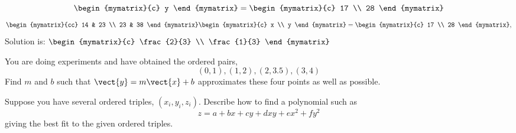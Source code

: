 \begin{enumialphparenastyle}
\begin{ex}
\begin{sol}
\[\begin{mymatrix}{c}
y
\end{mymatrix} =\begin{mymatrix}{c}
17 \\
28
\end{mymatrix}
\]
\[
\begin{mymatrix}{cc}
14 & 23 \\
23 & 38
\end{mymatrix} \begin{mymatrix}{c}
x \\
y
\end{mymatrix} =\begin{mymatrix}{c}
17 \\
28
\end{mymatrix} ,
\]
Solution is: $\begin{mymatrix}{c}
\frac{2}{3} \\
\frac{1}{3}
\end{mymatrix}$
\end{sol}
\end{ex}

\begin{ex}
 You are doing experiments and have obtained the ordered pairs, 
\begin{equation*}
\left( 0,1\right) ,\left( 1,2\right) ,\left( 2,3.5\right) ,\left( 3,4\right)
\end{equation*}
Find $m$ and $b$ such that $\vect{y}=m\vect{x}+b$ approximates these four points as well
as possible. 
\end{ex}

\begin{ex}
Suppose you have several ordered triples, $\left(
x_{i},y_{i},z_{i}\right) .$ Describe how to find a polynomial such as  
\begin{equation*}
z=a+bx+cy+dxy+ex^{2}+fy^{2}
\end{equation*}
 giving the best fit to the given ordered triples.
\end{ex}

\end{enumialphparenastyle}